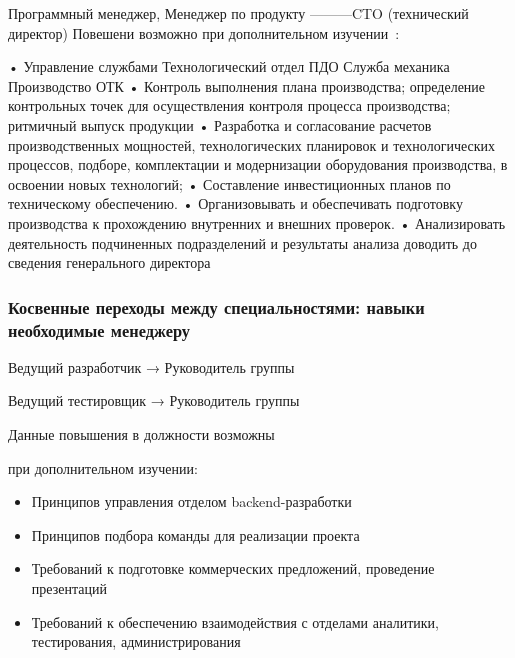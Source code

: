 \documentclass{../industrial-development}
\begin{document}
\lecturenotes

Программный менеджер, Менеджер по продукту ---------CTO (технический директор)
Повешени возможно при дополнительном изучении~\cite{rab}:
 
•	Управление службами
	Технологический отдел
	ПДО
Служба механика
	Производство
	ОТК
•	Контроль выполнения плана производства; определение контрольных точек для осуществления контроля процесса производства; ритмичный выпуск продукции
•	Разработка и согласование расчетов производственных мощностей, технологических планировок и технологических процессов, подборе, комплектации и модернизации оборудования производства, в освоении новых технологий;
•	Составление инвестиционных планов по техническому обеспечению.
•	Организовывать и обеспечивать подготовку производства к прохождению внутренних и внешних проверок.
•	Анализировать деятельность подчиненных подразделений и результаты анализа доводить до сведения генерального директора


\begin{frame} \frametitle{Косвенные переходы между специальностями: навыки необходимые менеджеру}

\begin{block}{Ведущий разработчик → Руководитель группы  

Ведущий тестировщик → Руководитель группы }

Данные повышения в должности возможны 

при дополнительном изучении:
  \end{block}
\begin{itemize}
  \item Принципов управления отделом backend-разработки
  \item Принципов подбора команды для реализации проекта
  \item Требований к подготовке коммерческих предложений, проведение презентаций
  \item Требований к обеспечению взаимодействия с отделами аналитики, тестирования, администрирования
  \end{itemize}
\end{frame}

\lecturenotes
\end{document}
